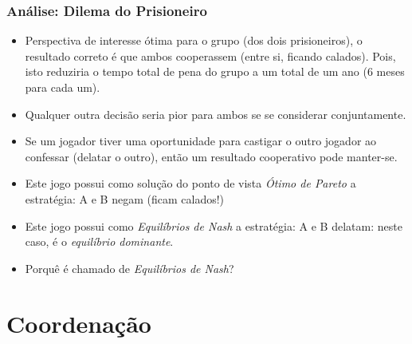 \begin{frame}
    \frametitle{Análise: Dilema do Prisioneiro}

 \begin{itemize}
  
 
   \item Perspectiva de interesse ótima para o grupo (dos dois prisioneiros), o resultado correto é que  ambos cooperassem (entre si, ficando calados).
   Pois,  isto reduziria o tempo total de pena do grupo a um total de um ano (6 meses para cada um).

   \item  Qualquer outra decisão seria pior para ambos se se considerar conjuntamente.

\item Se um jogador tiver uma oportunidade para castigar o outro jogador ao confessar (delatar o outro), então um resultado cooperativo pode manter-se.
   \pause
   
   
\item Este jogo possui como solução do ponto de vista \textit{Ótimo de Pareto} a estratégia:
A e B negam (ficam calados!)

\pause
   
   
\item Este jogo possui como 
\textit{Equilíbrios de Nash} a estratégia: 
A e B delatam: neste caso, é o \textit{equilíbrio dominante}.

\item Porquê é chamado de \textit{Equilíbrios de Nash}?
     
 \end{itemize}
 
 


\end{frame}




\section{Coordenação}


